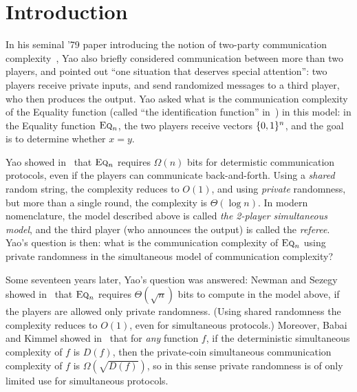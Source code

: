 \section{Introduction}
\label{sec:intro}

In his seminal '79 paper introducing the notion of two-party communication complexity~\cite{Yao79},
Yao also briefly considered communication between more than two players, and pointed out ``one situation that deserves special attention'': two players receive private inputs, and send randomized messages to a third player, who then produces the output.
Yao asked what is the communication complexity of the Equality function (called ``the identification function'' in~\cite{Yao79}) in this model:
in 
the Equality function $\text{\textsc{Eq}}_n$, the two players receive vectors $\{ 0,1 \}^n$, and the goal is to determine whether $x = y$.


Yao showed in~\cite{Yao79} that $\text{\textsc{Eq}}_n$ requires $\Omega(n)$ bits for determistic communication protocols, even if the players can communicate back-and-forth. Using a \emph{shared} random string, the complexity reduces to $O(1)$, and using \emph{private} randomness, but more than a single round, the complexity is $\Theta(\log n)$. In modern nomenclature, the model described above is called \emph{the 2-player simultaneous model}, and the third player (who announces the output) is called the \emph{referee}. Yao's question is then: what is the communication complexity of $\text{\textsc{Eq}}_n$ using private randomness in the simultaneous model of communication complexity?

Some seventeen years later, Yao's question was answered: Newman and Sezegy showed in~\cite{NS96} that $\text{\textsc{Eq}}_n$ requires $\Theta(\sqrt{n})$ bits to compute in the model above, if the players are allowed only private randomness. (Using shared randomness the complexity reduces to $O(1)$, even for simultaneous protocols.) Moreover, Babai and Kimmel showed in~\cite{BK97} that for \emph{any} function $f$, if the deterministic simultaneous complexity of $f$ is $D(f)$, then the private-coin simultaneous communication complexity of $f$ is $\Omega(\sqrt{D(f)})$, so in this sense private randomness is of only limited use for simultaneous protocols.

